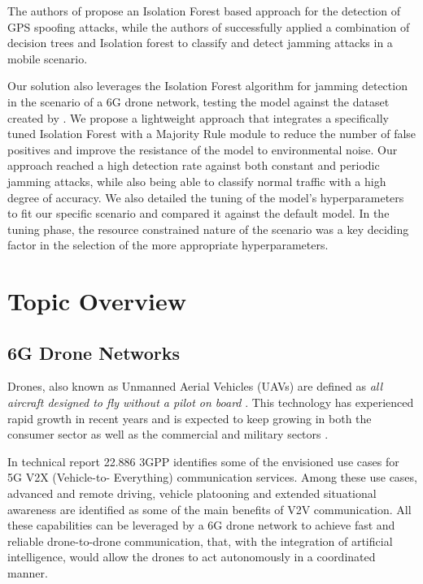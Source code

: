 \documentclass[futureinternet,article,submit,pdftex,moreauthors]{Definitions/mdpi}
\begin{document}
The authors of \cite{GPSSpoofingDetection-Zuo} propose an Isolation Forest based approach for the detection of GPS spoofing attacks, while the authors of \cite{HybridJammingDetection-Hong} successfully applied a combination of decision trees and Isolation forest to classify 
and detect jamming attacks in a mobile scenario. 

Our solution also leverages the Isolation Forest algorithm for jamming detection in the scenario of a 6G drone network, testing the model against the dataset created by \cite{JammingDetectionIoT-Hussain}.
We propose a lightweight approach that integrates a specifically tuned Isolation Forest with a Majority Rule module to reduce the number of false positives and improve the resistance of the model to environmental noise.
Our approach reached a high detection rate against both constant and periodic jamming attacks, while also being able to classify normal traffic with a high degree of accuracy. We also detailed the tuning of the model's hyperparameters to fit our specific scenario and compared it 
against the default model. In the tuning phase, the resource constrained nature of the scenario was a key deciding factor in the selection of the more appropriate hyperparameters.

\section{Topic Overview}

\subsection{6G Drone Networks}

Drones, also known as Unmanned Aerial Vehicles (UAVs) are defined as \textit{all aircraft designed to fly
without a pilot on board} \cite{DronesEC}. This technology has experienced rapid growth in recent years and is expected to 
keep growing in both the consumer sector as well as the commercial and military sectors \cite{DronesStatisticsLaricchia}.

In technical report 22.886 \cite{5GV2XSultan} 3GPP identifies some of the envisioned use cases for 5G V2X (Vehicle-to-
Everything) communication services. Among these use cases, advanced and remote driving, vehicle platooning and extended situational awareness are identified as some of the main benefits
of V2V communication. All these capabilities can be leveraged by a 6G drone network to achieve fast and reliable drone-to-drone communication, that, with the integration of artificial intelligence, 
would allow the drones to act autonomously in a coordinated manner. 
\end{document}
